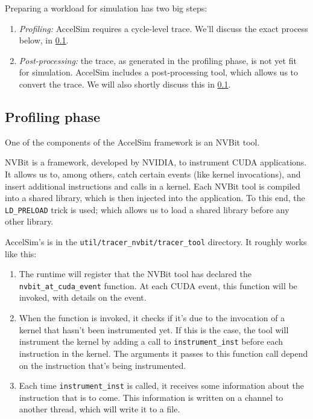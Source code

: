 Preparing a workload for simulation has two big steps:
\begin{enumerate}
    \item \textit{Profiling:} AccelSim requires a cycle-level trace.
    We'll discuss the exact process below, in \cref{subsec:profiling-phase}.
    \item \textit{Post-processing:} the trace, as generated in the profiling phase, is not yet fit for simulation.
    AccelSim includes a post-processing tool, which allows us to convert the trace.
    We will also shortly discuss this in \cref{subsec:profiling-phase}.
\end{enumerate}

\subsection{Profiling phase}\label{subsec:profiling-phase}
One of the components of the AccelSim framework is an NVBit\cite{nvbit} tool.

NVBit is a framework, developed by NVIDIA, to instrument CUDA applications.
It allows us to, among others, catch certain events (like kernel invocations), and insert additional instructions and calls in a kernel.
Each NVBit tool is compiled into a shared library, which is then injected into the application.
To this end, the \verb|LD_PRELOAD| trick is used; which allows us to load a shared library before any other library.

AccelSim's is in the \verb|util/tracer_nvbit/tracer_tool| directory.
It roughly works like this:
\begin{enumerate}
    \item The runtime will register that the NVBit tool has declared the \verb|nvbit_at_cuda_event| function.
    At each CUDA event, this function will be invoked, with details on the event.
    \item When the function is invoked, it checks if it's due to the invocation of a kernel that hasn't been instrumented yet.
    If this is the case, the tool will instrument the kernel by adding a call to \verb|instrument_inst| before each instruction in the kernel.
    The arguments it passes to this function call depend on the instruction that's being instrumented.
    \item Each time \verb|instrument_inst| is called, it receives some information about the instruction that is to come.
    This information is written on a channel to another thread, which will write it to a file.
\end{enumerate}


